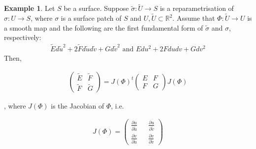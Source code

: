 \documentclass{article}
\theoremstyle{plain}
\theoremstyle{definition}
\newtheorem{example}{Example}
\theoremstyle{remark}
\newcommand{\R}{\mathbb{R}}
\begin{document}
\begin{example}
    Let \(S\) be a surface. Suppose \(\tilde{\sigma}: \tilde{U} \rightarrow S \) is a reparametrisation of \(\sigma: U \rightarrow S \), where \(\sigma\) is a surface patch of \(S\) and \( U, \tilde{U} \subset \R^2 \).
    Assume that \( \Phi: \tilde{U} \rightarrow U\) is a smooth map and the following are the first fundamental form of \(\tilde{\sigma}\) and \(\sigma\), respectively:
    \begin{align*}
        \tilde{E} d\tilde{u}^2 + 2\tilde{F} d\tilde{u} d\tilde{v} + G d\tilde{v}^2
        \text{  and  }
        E du^2 + 2F du dv + G dv^2
    \end{align*}
    Then,
\end{example}
\begin{align} \label{eq: reparmetrisation affect on the first fundamental form}
    \begin{pmatrix}
        \tilde{E} & \tilde{F} \\
        \tilde{F} & \tilde{G}
    \end{pmatrix}
    =
    J(\Phi)^t
    \begin{pmatrix}
        E & F \\
        F & G
    \end{pmatrix}
    J(\Phi)
\end{align}

, where \( J(\Phi) \) is the Jacobian of \(\Phi\), i.e.

\begin{align*}
    J(\Phi) =
    \begin{pmatrix}
        \frac{\partial u}{ \partial \tilde{u}} &  & \frac{\partial u}{ \partial \tilde{v}} \\
        \frac{\partial v}{ \partial \tilde{u}} &  & \frac{\partial v}{ \partial \tilde{v}}
    \end{pmatrix}
\end{align*}
\end{document}
